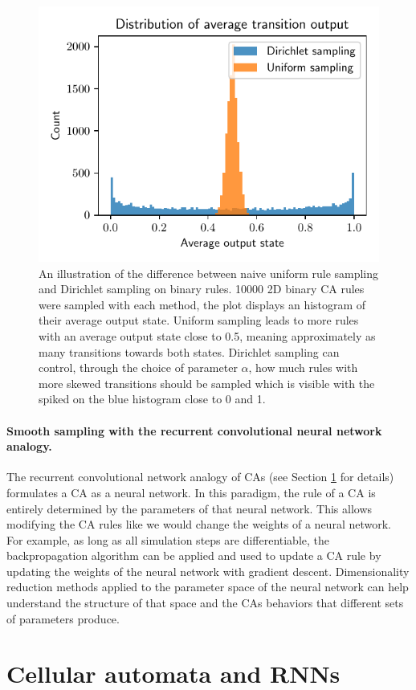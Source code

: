 \begin{figure}[htbp]
  \centering
  \includegraphics[width=.5\linewidth]{figures/ca_rule_sampling_hist}
  \caption{An illustration of the difference between naive uniform rule sampling
    and Dirichlet sampling on binary rules. 10000 2D binary CA rules were
    sampled with each method, the plot displays an histogram of their average
    output state. Uniform sampling leads to more rules with an average output
    state close to 0.5, meaning approximately as many transitions towards both
    states. Dirichlet sampling can control, through the choice of parameter $\alpha$,
    how much rules with more skewed transitions should be sampled which is
    visible with the spiked on the blue histogram close to 0 and 1.}
  \label{fig:ca_rule_sampling}
\end{figure}

\paragraph{Smooth sampling with the recurrent convolutional neural network
  analogy.}

The recurrent convolutional network analogy of \acp{CA} (see Section
\ref{sec:cell-autom-rnns} for details) formulates a \ac{CA} as a neural network.
In this paradigm, the rule of a \ac{CA} is entirely determined by the parameters
of that neural network. This allows modifying the \ac{CA} rules like we would
change the weights of a neural network. For example, as long as all simulation
steps are differentiable, the backpropagation algorithm can be applied and used
to update a \ac{CA} rule by updating the weights of the neural network with
gradient descent. Dimensionality reduction methods applied to the parameter
space of the neural network can help understand the structure of that space and
the \acp{CA} behaviors that different sets of parameters produce.


\section{Cellular automata and RNNs}\label{sec:cell-autom-rnns}

